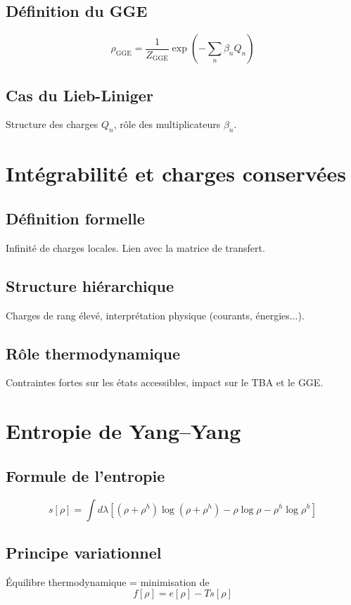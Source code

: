 \subsection{Définition du GGE}
\[
\rho_{\mathrm{GGE}} = \frac{1}{Z_{\mathrm{GGE}}} \exp\left(-\sum_n \beta_n Q_n\right)
\]

\subsection{Cas du Lieb-Liniger}
Structure des charges $Q_n$, rôle des multiplicateurs $\beta_n$.

\section{Intégrabilité et charges conservées}

\subsection{Définition formelle}
Infinité de charges locales. Lien avec la matrice de transfert.

\subsection{Structure hiérarchique}
Charges de rang élevé, interprétation physique (courants, énergies...).

\subsection{Rôle thermodynamique}
Contraintes fortes sur les états accessibles, impact sur le TBA et le GGE.

\section{Entropie de Yang–Yang}

\subsection{Formule de l’entropie}
\[
s[\rho] = \int d\lambda \left[ (\rho + \rho^h)\log(\rho + \rho^h) - \rho \log \rho - \rho^h \log \rho^h \right]
\]

\subsection{Principe variationnel}
Équilibre thermodynamique = minimisation de
\[
f[\rho] = e[\rho] - T s[\rho]
\]

